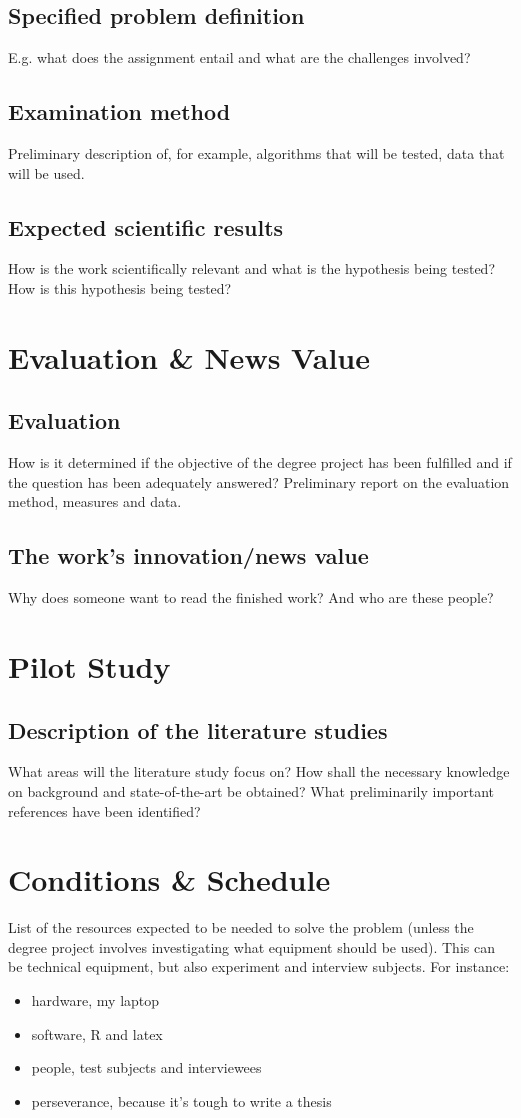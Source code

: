 \documentclass[12pt]{article}
\begin{document}
\subsection*{Specified problem definition}
E.g. what does the assignment entail and what are the challenges involved?
\subsection*{Examination method}
Preliminary description of, for example, algorithms that will be tested, data that will be used.
\subsection*{Expected scientific results}
How is the work scientifically relevant and what is the hypothesis being tested? How is this hypothesis being tested?
\section*{Evaluation \& News Value}
\subsection*{Evaluation}
How is it determined if the objective of the degree project has been fulfilled and if the question has been adequately answered? Preliminary report on the evaluation method, measures and data.
\subsection*{The work's innovation/news value} 
Why does someone want to read the finished work? And who are these people?
\section*{Pilot Study}
\subsection*{Description of the literature studies}
What areas will the literature study focus on? How shall the necessary knowledge on background and state-of-the-art be obtained? What preliminarily important references have been identified?
\section*{Conditions \& Schedule}
List of the resources expected to be needed to solve the problem (unless the degree project involves investigating what equipment should be used). This can be technical equipment, but also experiment and interview subjects. For instance:
\begin{itemize}
\item hardware, my laptop
\item software, R and latex
\item people, test subjects and interviewees 
\item perseverance, because it's tough to write a thesis
\end{itemize}
\end{document}
